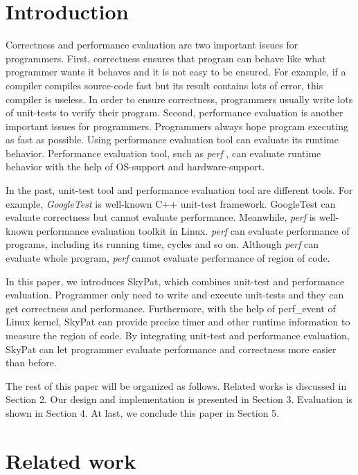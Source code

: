 \documentclass[final]{ols}
\begin{document}
\section{Introduction}
Correctness and performance evaluation are two important issues for programmers.
First, correctness ensures that program can behave like what programmer wants it behaves and it is not easy to be ensured. 
For example, if a compiler compiles source-code fast but its result contains lots of error, this compiler is useless.
In order to ensure correctness, programmers usually write lots of unit-tests to verify their program.
Second, performance evaluation is another important issues for programmers.
Programmers always hope program executing as fast as possible.
Using performance evaluation tool can evaluate its runtime behavior. 
Performance evaluation tool, such as \textit{perf} \cite{perf-tools}, can evaluate runtime behavior with the help of OS-support and hardware-support.

In the past, unit-test tool and performance evaluation tool are different tools. 
For example, \textit{GoogleTest} \cite{Google-test} is well-known C++ unit-test framework.
GoogleTest can evaluate correctness but cannot evaluate performance. 
Meanwhile, \textit{perf} is well-known performance evaluation toolkit in Linux. 
\textit{perf} can evaluate performance of programs, including its running time, cycles and so on.
Although \textit{perf} can evaluate whole program, \textit{perf} cannot evaluate performance of region of code.

In this paper, we introduces SkyPat, which combines unit-test and performance evaluation.
Programmer only need to write and execute unit-tests and they can get correctness and performance.
Furthermore, with the help of perf\_event of Linux kernel, SkyPat can provide precise timer and other runtime information to measure the region of code.
By integrating unit-test and performance evaluation, SkyPat can let programmer evaluate performance and correctness more easier than before.

The rest of this paper will be organized as follows. 
Related works is discussed in Section 2. 
Our design and implementation is presented in Section 3.
Evaluation is shown in Section 4.
At last, we conclude this paper in Section 5.

\section{Related work}
\end{document}
